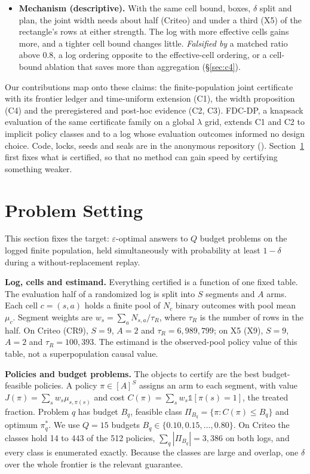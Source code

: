 \documentclass[sigconf,anonymous,review]{acmart}
\newcommand{\eps}{\varepsilon}
\begin{document}
\begin{itemize}
\item[\textbf{C4}] \textbf{Mechanism (descriptive).} With the same cell bound, boxes, $\delta$ split and plan, the joint width needs about half (Criteo) and under a third (X5) of the rectangle's rows at either strength. The log with more effective cells gains more, and a tighter cell bound changes little. \emph{Falsified by} a matched ratio above 0.8, a log ordering opposite to the effective-cell ordering, or a cell-bound ablation that saves more than aggregation (\S\ref{sec:c4}).
\end{itemize}

\noindent Our contributions map onto these claims: the finite-population joint certificate with its frontier ledger and time-uniform extension (C1), the width proposition (C4) and the preregistered and post-hoc evidence (C2, C3). FDC-DP, a knapsack evaluation of the same certificate family on a global $\lambda$ grid, extends C1 and C2 to implicit policy classes and to a log whose evaluation outcomes informed no design choice. Code, locks, seeds and seals are in the anonymous repository (\anonrepo). Section~\ref{sec:setting} first fixes what is certified, so that no method can gain speed by certifying something weaker.

\section{Problem Setting}\label{sec:setting}

This section fixes the target: $\eps$-optimal answers to $Q$ budget problems on the logged finite population, held simultaneously with probability at least $1-\delta$ during a without-replacement replay.

\textbf{Log, cells and estimand.} Everything certified is a function of one fixed table. The evaluation half of a randomized log is split into $S$ segments and $A$ arms. Each cell $c = (s,a)$ holds a finite pool of $N_c$ binary outcomes with pool mean $\mu_c$. Segment weights are $w_s = \sum_a N_{s,a}/\tau_R$, where $\tau_R$ is the number of rows in the half. On Criteo (CR9), $S = 9$, $A = 2$ and $\tau_R = 6{,}989{,}799$; on X5 (X9), $S = 9$, $A = 2$ and $\tau_R = 100{,}393$. The estimand is the observed-pool policy value of this table, not a superpopulation causal value.

\textbf{Policies and budget problems.} The objects to certify are the best budget-feasible policies. A policy $\pi \in [A]^S$ assigns an arm to each segment, with value $J(\pi) = \sum_s w_s \mu_{s,\pi(s)}$ and cost $C(\pi) = \sum_s w_s \mathbb{1}[\pi(s) = 1]$, the treated fraction. Problem $q$ has budget $B_q$, feasible class $\Pi_{B_q} = \{\pi : C(\pi) \le B_q\}$ and optimum $\pi^*_q$. We use $Q = 15$ budgets $B_q \in \{0.10, 0.15, \dots, 0.80\}$. On Criteo the classes hold 14 to 443 of the 512 policies, $\sum_q |\Pi_{B_q}| = 3{,}386$ on both logs, and every class is enumerated exactly. Because the classes are large and overlap, one $\delta$ over the whole frontier is the relevant guarantee.
\end{document}
